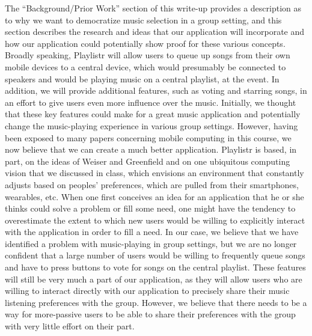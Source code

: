 \documentclass[12pt]{article}
\begin{document}
The “Background/Prior Work” section of this write-up provides a
description as to why we want to democratize music selection in a
group setting, and this section describes the research and ideas that
our application will incorporate and how our application could
potentially show proof for these various concepts. Broadly speaking,
Playlistr will allow users to queue up songs from their own mobile
devices to a central device, which would presumably be connected to
speakers and would be playing music on a central playlist, at the
event. In addition, we will provide additional features, such as
voting and starring songs, in an effort to give users even more
influence over the music. Initially, we thought that these key
features could make for a great music application and potentially
change the music-playing experience in various group
settings. However, having been exposed to many papers concerning
mobile computing in this course, we now believe that we can create a
much better application. Playlistr is based, in part, on the ideas of
Weiser and Greenfield and on one ubiquitous computing vision that we
discussed in class, which envisions an environment that constantly
adjusts based on peoples’ preferences, which are pulled from their
smartphones, wearables, etc. When one first conceives an idea for an
application that he or she thinks could solve a problem or fill some
need, one might have the tendency to overestimate the extent to which
new users would be willing to explicitly interact with the application
in order to fill a need. In our case, we believe that we have
identified a problem with music-playing in group settings, but we are
no longer confident that a large number of users would be willing to
frequently queue songs and have to press buttons to vote for songs on
the central playlist. These features will still be very much a part of
our application, as they will allow users who are willing to interact
directly with our application to precisely share their music listening
preferences with the group. However, we believe that there needs to be
a way for more-passive users to be able to share their preferences
with the group with very little effort on their part.
\end{document}
